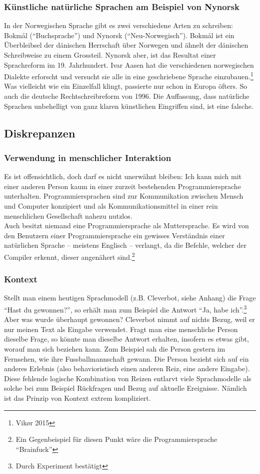 \documentclass[10pt,a4paper]{article}
\begin{document}
\subsubsection{Künstliche natürliche Sprachen am Beispiel von Nynorsk}
In der Norwegischen Sprache gibt es zwei verschiedene Arten zu schreiben: Bokmål (\enquote{Buchsprache}) und Nynorsk (\enquote{Neu-Norwegisch}). Bokmål ist ein Überbleibsel der dänischen Herrschaft über Norwegen und ähnelt der dänischen Schreibweise zu einem Grossteil. Nynorsk aber, ist das Resultat einer Sprachreform im 19. Jahrhundert. Ivar Aasen hat die verschiedenen norwegischen Dialekte erforscht und versucht sie alle in eine geschriebene Sprache einzubauen.\footnote{Vikør 2015} \\
Was vielleicht wie ein Einzelfall klingt, passierte nur schon in Europa öfters. So auch die deutsche Rechtschreibreform von 1996. Die Auffassung, dass natürliche Sprachen unbehelligt von ganz klaren künstlichen Eingriffen sind, ist eine falsche.


\subsection{Diskrepanzen}
\subsubsection{Verwendung in menschlicher Interaktion}
Es ist offensichtlich, doch darf es nicht unerwähnt bleiben: Ich kann mich mit einer anderen Person kaum in einer zurzeit bestehenden Programmiersprache unterhalten. Programmiersprachen sind zur Kommunikation zwischen Mensch und Computer konzipiert und als Kommunikationsmittel in einer rein menschlichen Gesellschaft nahezu nutzlos. \\
Auch besitzt niemand eine Programmiersprache als Muttersprache. Es wird von den Benutzern einer Programmiersprache ein gewisses Verständnis einer natürlichen Sprache -- meistens Englisch --  verlangt, da die Befehle, welcher der Compiler erkennt, dieser angenähert sind.\footnote{Ein Gegenbeispiel für diesen Punkt wäre die Programmiersprache \enquote{Brainfuck}} 


\subsubsection{Kontext}
Stellt man einem heutigen Sprachmodell (z.B. Cleverbot, siehe Anhang) die Frage \enquote{Hast du gewonnen?}, so erhält man zum Beispiel die Antwort \enquote{Ja, habe ich}.\footnote{Durch Experiment bestätigt} Aber was wurde überhaupt gewonnen? Cleverbot nimmt auf nichts Bezug, weil er nur meinen Text als Eingabe verwendet. Fragt man eine menschliche Person dieselbe Frage, so könnte man dieselbe Antwort erhalten, insofern es etwas gibt, worauf man sich beziehen kann. Zum Beispiel sah die Person gestern im Fernsehen, wie ihre Fussballmannschaft gewann. Die Person bezieht sich auf ein anderes Erlebnis (also behavioristisch einen anderen Reiz, eine andere Eingabe). \\
Diese fehlende logische Kombination von Reizen entlarvt viele Sprachmodelle als solche bei zum Beispiel Rückfragen und Bezug auf aktuelle Ereignisse. Nämlich ist das Prinzip von Kontext extrem kompliziert.
\end{document}
